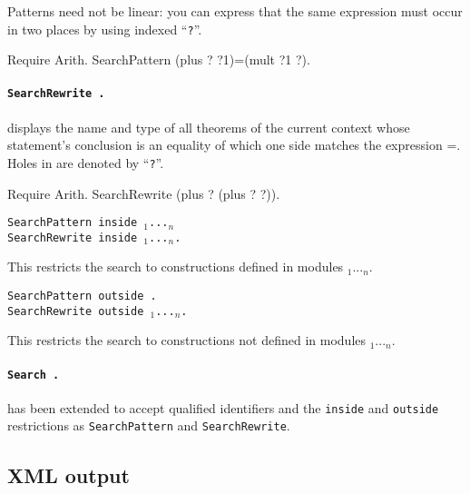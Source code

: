 \documentclass[11pt]{article}
\begin{document}
Patterns need not be linear: you can express that the same
expression must occur in two places by using indexed ``{\tt ?}''.

\begin{coq_example}
Require Arith.
SearchPattern (plus ? ?1)=(mult ?1 ?).
\end{coq_example}

\paragraph{{\tt SearchRewrite {\term}.}}
displays the name and type of all theorems of the current
context whose statement's conclusion is an equality of which one side matches
the expression {\term =}. Holes in {\term} are denoted by ``{\tt ?}''.

\begin{coq_example}
Require Arith.
SearchRewrite (plus ? (plus ? ?)).
\end{coq_example}

\begin{Variants}

\item {\tt SearchPattern {\term} inside {\module$_1$}...{\module$_n$}}\\
{\tt SearchRewrite {\term} inside
{\module$_1$}...{\module$_n$}.}

  This restricts the search to constructions defined in modules {\module$_1$}...{\module$_n$}.

\item {\tt SearchPattern {\term} outside {\module}.}\\
{\tt SearchRewrite {\term} outside {\module$_1$}...{\module$_n$}.}

  This restricts the search to constructions not defined in modules {\module$_1$}...{\module$_n$}.

\end{Variants}

\paragraph{{\tt Search {\ident}.}} has been extended to accept qualified
identifiers and the {\tt inside} and {\tt outside} restrictions as
{\tt SearchPattern} and {\tt SearchRewrite}.

\subsection{XML output}
\label{XML}
\end{document}
